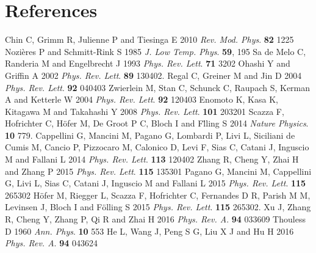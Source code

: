 \documentclass[a4paper]{jpconf}
\begin{document}
\section*{References}
\begin{thebibliography}{99}
 Chin C, Grimm R, Julienne P and Tiesinga E 2010 {\it Rev. Mod. Phys}. {\bf 82} 1225
 Nozi\`eres P and Schmitt-Rink S 1985 {\it J. Low Temp. Phys}. {\bf 59}, 195
 Sa de Melo C, Randeria M and Engelbrecht J 1993 {\it Phys. Rev. Lett}. {\bf 71} 3202
 Ohashi Y and Griffin A 2002 {\it Phys. Rev. Lett}. {\bf 89} 130402.
 Regal C, Greiner M and Jin D 2004 {\it Phys. Rev. Lett}. {\bf 92} 040403
 Zwierlein M, Stan C, Schunck C, Raupach S, Kerman A and Ketterle W 2004 {\it Phys. Rev. Lett}. {\bf 92} 120403
 Enomoto K, Kasa K, Kitagawa M and Takahashi Y 2008 {\it Phys. Rev. Lett}. {\bf 101} 203201   
 Scazza F, Hofrichter C, H\"ofer M, De Groot P C, Bloch I and F\"lling S 2014 {\it Nature Physics}. {\bf 10} 779.
 Cappellini G, Mancini M, Pagano G, Lombardi P, Livi L, Siciliani de Cumis M, Cancio P, Pizzocaro M, Calonico D, Levi F, Sias C, Catani J, Inguscio M and Fallani L 2014 {\it Phys. Rev. Lett}. {\bf 113} 120402
 Zhang R, Cheng Y, Zhai H and Zhang P 2015 {\it Phys. Rev. Lett}. {\bf 115} 135301
 Pagano G, Mancini M, Cappellini G, Livi L, Sias C, Catani J, Inguscio M and Fallani L 2015 {\it Phys. Rev. Lett}. {\bf 115} 265302
 H\"ofer M, Riegger L, Scazza F, Hofrichter C, Fernandes D R, Parish M M, Levinsen J, Bloch I and F\"olling S 2015 {\it Phys. Rev. Lett}. {\bf 115} 265302.
 Xu J, Zhang R, Cheng Y, Zhang P, Qi R and Zhai H 2016 {\it Phys. Rev. A}. {\bf 94} 033609
 Thouless D 1960 {\it Ann. Phys}. {\bf 10} 553
 He L, Wang J,  Peng S G, Liu X J and Hu H 2016 {\it Phys. Rev. A}. {\bf 94} 043624
\end{thebibliography}
\end{document}
